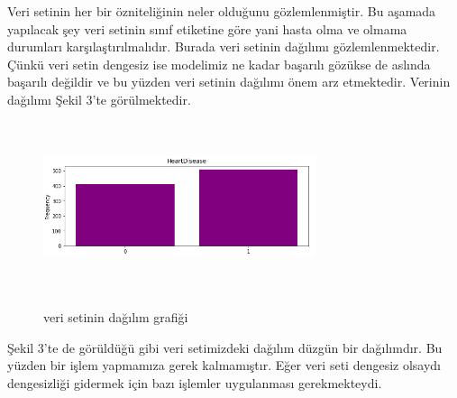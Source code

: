 \documentclass[conference]{IEEEtran}
\begin{document}
Veri setinin her bir özniteliğinin neler olduğunu gözlemlenmiştir. Bu aşamada yapılacak şey veri setinin sınıf etiketine göre yani hasta olma ve olmama durumları karşılaştırılmalıdır. Burada veri setinin dağılımı gözlemlenmektedir. Çünkü veri setin dengesiz ise modelimiz ne kadar başarılı gözükse de aslında başarılı değildir ve bu yüzden veri setinin dağılımı önem arz etmektedir. Verinin dağılımı Şekil 3'te görülmektedir.
\begin{figure}[htbp]
    \centering
   	\includegraphics[width=8cm, height=5cm]{images/dagilim.PNG}\\
	\caption{veri setinin dağılım grafiği}
    \label{fig}
\end{figure}
Şekil 3'te de görüldüğü gibi veri setimizdeki dağılım düzgün bir dağılımdır. Bu yüzden bir işlem yapmamıza gerek kalmamıştır. Eğer veri seti dengesiz olsaydı dengesizliği gidermek için bazı işlemler uygulanması gerekmekteydi.
\end{document}
